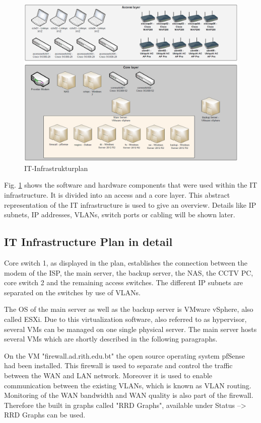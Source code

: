\begin{figure}[H]
	\centering
	\includegraphics[width=1.0\textwidth]{BilderAllgemein/it_infrastruktur_plan_2.png}
	\caption{IT-Infrastrukturplan}
	\label{img:it_infrastruktur_plan}
\end{figure}

Fig. \ref{img:it_infrastruktur_plan} shows the software and hardware components that were used within the IT infrastructure. It is divided into an access and a core layer. This abstract representation of the IT infrastructure is used to give an overview. Details like \ac{IP} subnets, \ac{IP} addresses, \acp{VLAN}, switch ports or cabling will be shown later.

\subsection{IT Infrastructure Plan in detail}

Core switch 1, as displayed in the plan, establishes the connection between the modem of the \ac{ISP}, the main server, the backup server, the NAS, the CCTV PC, core switch 2 and the remaining access switches. The different IP subnets are separated on the switches by use of VLANs. 

The \ac{OS} of the main server as well as the backup server is VMware vSphere, also called ESXi. Due to this virtualization software, also referred to as hypervisor, several \acp{VM} can be managed on one single physical server. The main server hosts several VMs which are shortly described in the following paragraphs.

On the VM "firewall.ad.rith.edu.bt" the open source operating system pfSense had been installed. This firewall is used to separate and control the traffic between the \ac{WAN} and \ac{LAN} network. Moreover it is used to enable communication between the existing VLANs, which is known as VLAN routing. Monitoring of the WAN bandwidth and WAN quality is also part of the firewall. Therefore the built in graphs called "RRD Graphs", available under Status --> RRD Graphs can be used.

